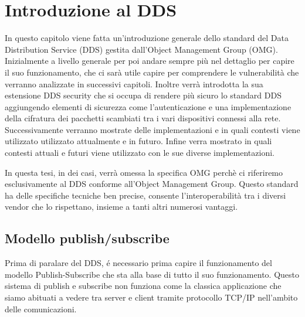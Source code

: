 \chapter{Introduzione al DDS}
In questo capitolo viene fatta un'introduzione generale dello 
standard del Data Distribution Service (DDS) gestita
dall'Object Management Group (OMG). Inizialmente a livello generale 
per poi andare sempre più nel
dettaglio per capire il suo funzionamento, che ci sarà utile 
capire per comprendere le vulnerabilità che verranno analizzate in
successivi capitoli. Inoltre verrà introdotta la sua estensione
DDS security che si occupa di rendere più sicuro lo standard DDS 
aggiungendo elementi di sicurezza come l'autenticazione e una 
implementazione della cifratura dei pacchetti scambiati tra i vari
dispositivi connessi alla rete. Successivamente verranno mostrate delle 
implementazioni e in quali contesti viene utilizzato utilizzato
attualmente e in futuro. 
Infine verra mostrato in quali contesti attuali e futuri viene
utilizzato con le sue diverse implementazioni.

In questa tesi, in dei casi, verrà omessa la specifica OMG perchè 
ci riferiremo
esclusivamente al DDS conforme all'Object Management Group. Questo 
standard ha delle specifiche tecniche ben precise, consente
l'interoperabilità tra i diversi vendor che lo rispettano, insieme
a tanti altri numerosi vantaggi.
\cite{dds1.4}


\section{Modello publish/subscribe}
Prima di paralare del DDS, é necessario prima capire il 
funzionamento del modello Publish-Subscribe 
che sta alla base di tutto il suo funzionamento.
Questo sistema di publish e subscribe non funziona come la 
classica applicazione che siamo abituati a vedere tra server e
client tramite protocollo TCP/IP nell'ambito delle comunicazioni. 


